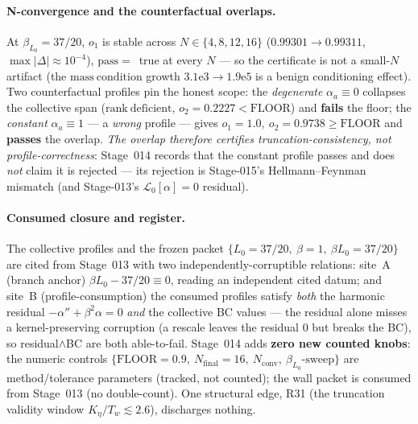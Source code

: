 \paragraph{N-convergence and the counterfactual overlaps.}
At \(\beta_{L_0}=37/20\), \(o_1\) is stable across \(N\in\{4,8,12,16\}\)
(\(0.99301\to0.99311\), \(\max|\Delta|\approx10^{-4}\)), \(\mathrm{pass}=\)~true at
every \(N\) --- so the certificate is not a small-\(N\) artifact (the
\(\mathrm{mass\ condition}\) growth \(3.1\mathrm{e}3\to1.9\mathrm{e}5\) is a benign
conditioning effect). Two counterfactual profiles pin the honest scope: the
\emph{degenerate} \(\alpha_a\equiv0\) collapses the collective span
(\(\mathrm{rank\ deficient}\), \(o_2=0.2227<\mathrm{FLOOR}\)) and \textbf{fails}
the floor; the \emph{constant} \(\alpha_a\equiv1\) --- a \emph{wrong} profile ---
gives \(o_1=1.0,\ o_2=0.9738\ge\mathrm{FLOOR}\) and \textbf{passes} the overlap.
\emph{The overlap therefore certifies truncation-consistency, not
profile-correctness}: Stage~014 records that the constant profile passes and does
\emph{not} claim it is rejected --- its rejection is Stage-015's Hellmann--Feynman
mismatch (and Stage-013's \(\mathcal{L}_0[\alpha]=0\) residual).

\paragraph{Consumed closure and register.}
The collective profiles and the frozen packet \(\{L_0=37/20,\ \beta=1,\ \beta
L_0=37/20\}\) are cited from Stage~013 with two independently-corruptible
relations: site~A (branch anchor) \(\beta L_0-37/20\equiv0\), reading an
independent cited datum; and site~B (profile-consumption) the consumed profiles
satisfy \emph{both} the harmonic residual \(-\alpha''+\beta^2\alpha=0\) \emph{and}
the collective BC values --- the residual alone misses a kernel-preserving
corruption (a rescale leaves the residual \(0\) but breaks the BC), so
residual\(\wedge\)BC are both able-to-fail. Stage~014 adds \textbf{zero new counted
knobs}: the numeric controls \(\{\mathrm{FLOOR}=0.9,\ N_{\mathrm{final}}=16,\
N_{\mathrm{conv}},\ \beta_{L_0}\text{-sweep}\}\) are method/tolerance parameters
(tracked, not counted); the wall packet is consumed from Stage~013 (no
double-count). One structural edge, R31 (the truncation validity window
\(K_\eta/T_w\lesssim2.6\)), discharges nothing.

